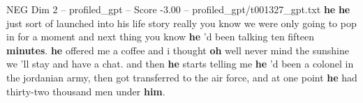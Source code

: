 \begin{textsample}{NEG Dim 2 – profiled\_gpt – Score -3.00 – profiled\_gpt/t001327\_gpt.txt}  \label{ex:f2_neg_031}
\textbf{he} \textbf{he} just sort of launched into his life story really you know we were only going to pop in for a moment and next thing you know \textbf{he} 'd been talking ten fifteen \textbf{minutes}. \textbf{he} offered me a coffee and i thought \textbf{oh} well never mind the sunshine we 'll stay and have a chat. and then \textbf{he} starts telling me \textbf{he} ’d been a colonel in the jordanian army, then got transferred to the air force, and at one point \textbf{he} had thirty-two thousand men under \textbf{him}.

\end{textsample}
